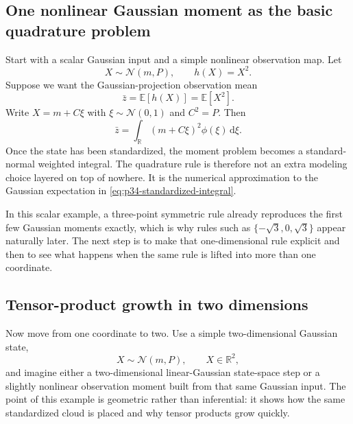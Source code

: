 \documentclass[11pt]{article}
\numberwithin{equation}{section}
\newcommand{\R}{\mathbb R}
\newcommand{\E}{\mathbb E}
\newcommand{\N}{\mathcal N}
\newcommand{\dd}{\,\mathrm d}
\begin{document}
\subsection{One nonlinear Gaussian moment as the basic quadrature problem}
\label{subsec:p34-scalar-motivation}

Start with a scalar Gaussian input and a simple nonlinear observation map.  Let
\begin{equation}
  X\sim\N(m,P),
  \qquad
  h(X)=X^2.
  \label{eq:p34-scalar-gaussian-model}
\end{equation}
Suppose we want the Gaussian-projection observation mean
\begin{equation}
  \bar z = \E[h(X)] = \E[X^2].
  \label{eq:p34-scalar-target-mean}
\end{equation}
Write \(X=m+C\xi\) with \(\xi\sim\N(0,1)\) and \(C^2=P\).  Then
\begin{equation}
  \bar z
  =
  \int_{\R} (m+C\xi)^2\phi(\xi)\dd\xi.
  \label{eq:p34-standardized-integral}
\end{equation}
Once the state has been standardized, the moment problem becomes a
standard-normal weighted integral.  The quadrature rule is therefore not an
extra modeling choice layered on top of nowhere.  It is the numerical
approximation to the Gaussian expectation in
\eqref{eq:p34-standardized-integral}.

In this scalar example, a three-point symmetric rule already reproduces the
first few Gaussian moments exactly, which is why rules such as
\(\{-\sqrt3,0,\sqrt3\}\) appear naturally later.  The next step is to make that
one-dimensional rule explicit and then to see what happens when the same rule is
lifted into more than one coordinate.

\subsection{Tensor-product growth in two dimensions}
\label{subsec:p34-2d-motivation}

Now move from one coordinate to two.  Use a simple two-dimensional Gaussian
state,
\begin{equation}
  X\sim\N(m,P),
  \qquad
  X\in\R^2,
  \label{eq:p34-2d-gaussian}
\end{equation}
and imagine either a two-dimensional linear-Gaussian state-space step or a
slightly nonlinear observation moment built from that same Gaussian input.  The
point of this example is geometric rather than inferential: it shows how the
same standardized cloud is placed and why tensor products grow quickly.
\end{document}
